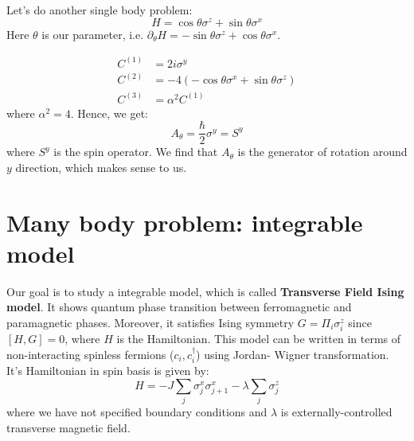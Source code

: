\documentclass[11pt,a4paper]{article}
\begin{document}
Let's do another single body problem:
\begin{equation}
H= \cos \theta \sigma^z + \sin \theta \sigma^x
\end{equation}
Here $\theta$ is our parameter, i.e. $\partial_{\theta} H=- \sin \theta \sigma^z + \cos \theta \sigma^x $.


\begin{align}
C^{(1)} &= 2 i \sigma^y \\
C^{(2)} &= - 4  ( -  \cos \theta \sigma^x + \sin \theta \sigma^z) \\
C^{(3)} &= \alpha^2 C^{(1)} 
\end{align}
where $\alpha^2=4$. Hence, we get:
\begin{equation}
A_{\theta}= \dfrac{ \hbar}{2}  \sigma^y = S^y
\end{equation}
where $S^y$ is the spin operator.  We find that $A_{\theta}$ is the generator of rotation around $y$ direction, which makes sense to us.
\section{Many body problem: integrable model}

Our goal is to study a integrable model, which is called \textbf{Transverse Field Ising model}. It shows quantum phase transition between ferromagnetic and paramagnetic phases. Moreover, it satisfies Ising symmetry $G= \Pi_i \sigma_i^z$ since $[H, G]=0$, where $H$ is the Hamiltonian.
This model can be written in terms of non-interacting spinless fermions ($c_i, c^{\dagger}_i $) using Jordan- Wigner transformation. It's Hamiltonian in spin basis is given by:
\begin{equation}
H= -J \sum_{j} \sigma_j^x \sigma_{j+1}^x - \lambda \sum_{j} \sigma_j^z 
\label{xx_z}
\end{equation}
where we have not specified boundary conditions and $\lambda$ is externally-controlled transverse magnetic field.
\end{document}

